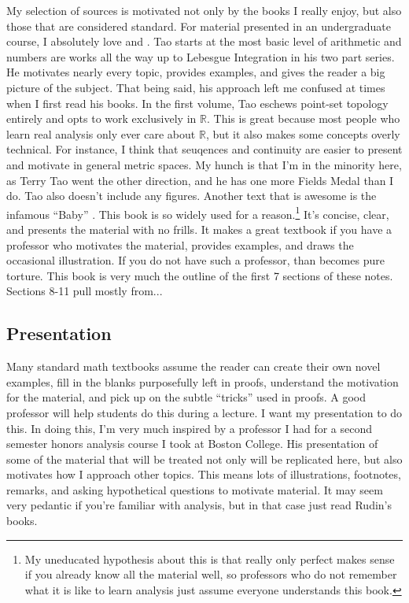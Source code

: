 \documentclass{article}
\newcommand{\R}{\mathbb{R}}
\theoremstyle{definition}
\begin{document}
My selection of sources is motivated not only by the books I really enjoy, but also those that are considered standard. For material presented in an undergraduate course, I absolutely love \cite{tao2006analysis} and \cite{tao2009analysis}. Tao starts at the most basic level of arithmetic and numbers are works all the way up to Lebesgue Integration in his two part series. He motivates nearly every topic, provides examples, and gives the reader a big picture of the subject. That being said, his approach left me confused at times when I first read his books. In the first volume, Tao eschews point-set topology entirely and opts to work exclusively in $ \R $. This is great because most people who learn real analysis only ever care about $ \R $, but it also makes some concepts overly technical. For instance, I think that seuqences and continuity are easier to present and motivate in general metric spaces. My hunch is that I'm in the minority here, as Terry Tao went the other direction, and he has one more Fields Medal than I do. Tao also doesn't include any figures. Another text that is awesome is the infamous ``Baby'' \cite{rudin1964principles}. This book is so widely used for a reason.\footnote{My uneducated hypothesis about this is that \cite{rudin1964principles} really only perfect makes sense if you already know all the material well, so professors who do not remember what it is like to learn analysis just assume everyone understands this book.} It's concise, clear, and presents the material with no frills. It makes a great textbook if you have a professor who motivates the material, provides examples, and draws the occasional illustration. If you do not have such a professor, than \cite{rudin1964principles} becomes pure torture. This book is very much the outline of the first 7 sections of these notes. Sections 8-11 pull mostly from...


\subsection{Presentation}
Many standard math textbooks assume the reader can create their own novel examples, fill in the blanks purposefully left in proofs, understand the motivation for the material, and pick up on the subtle ``tricks'' used in proofs. A good professor will help students do this during a lecture. I want my presentation to do this. In doing this, I'm very much inspired by a professor I had for a second semester honors analysis course I took at Boston College. His presentation of some of the material that will be treated not only will be replicated here, but also motivates how I approach other topics. This means lots of illustrations, footnotes, remarks, and asking hypothetical questions to motivate material. It may seem very pedantic if you're familiar with analysis, but in that case just read Rudin's books. 
\newpage
\end{document}
